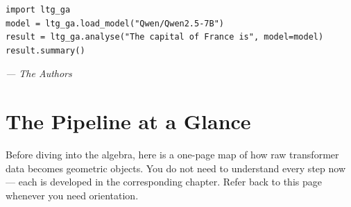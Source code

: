\documentclass[11pt, twoside, openright]{memoir}
\begin{document}
\begin{lstlisting}[caption={Three lines to GA}]
import ltg_ga
model = ltg_ga.load_model("Qwen/Qwen2.5-7B")
result = ltg_ga.analyse("The capital of France is", model=model)
result.summary()
\end{lstlisting}

\vspace{1em}
\hfill\emph{--- The Authors}

\clearpage
\pagestyle{ruled}
\tableofcontents*
\clearpage

\mainmatter


\chapter*{The Pipeline at a Glance}

Before diving into the algebra, here is a one-page map of how raw
transformer data becomes geometric objects.  You do not need to
understand every step now --- each is developed in the corresponding
chapter.  Refer back to this page whenever you need orientation.
\end{document}
